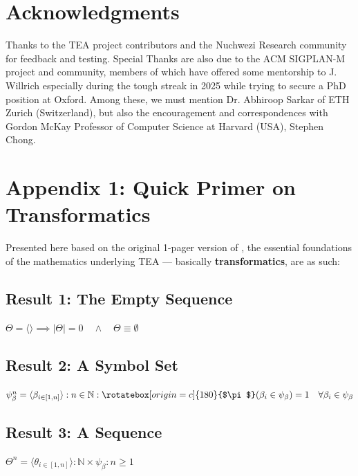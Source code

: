 \documentclass[acmtoplas]{acmart}
\newcommand{\invpi}[1]{\mathop{\rotatebox[origin=c]{180}{$\pi$}}#1}
\begin{document}
\section*{Acknowledgments}
\label{SECACK}

Thanks to the TEA project contributors and the Nuchwezi Research community for feedback and testing. Special Thanks are also due to the ACM SIGPLAN-M project and community, members of which have offered some mentorship to J. Willrich especially during the tough streak in 2025 while trying to secure a PhD position at Oxford. Among these, we must mention Dr. Abhiroop Sarkar of ETH Zurich (Switzerland), but also the encouragement and correspondences with Gordon McKay Professor of Computer Science at Harvard (USA), Stephen Chong.

\section*{Appendix 1: Quick Primer on Transformatics}
\label{SEC11}

\noindent Presented here based on the original 1-pager version \cite{lutalo_2025_trans101_1page} of \cite{Lutalo2025_transformatics_thesis}, the essential foundations of the mathematics underlying TEA --- basically \textbf{transformatics}, are as such:

\subsection{Result 1: The Empty Sequence\cite{lnspaper}}
\label{RES1}

$\Theta = \langle \rangle \implies |\Theta| = 0 \quad \land \quad \Theta \equiv \emptyset$

\subsection{Result 2: A Symbol Set\cite{Lutalo2024gtnc}}

$\psi_\beta^n = \langle \beta_{i \in [1,n]} \rangle : n \in \mathbb{N} : \invpi(\beta_i \in \psi_\beta) = 1 \quad \forall \beta_i \in \psi_\beta$

\subsection{Result 3: A Sequence\cite{lnspaper}}
\label{RES3}

$\Theta^n = \langle \theta_{i \in [1,n]} \rangle : \mathbb{N} \times \psi_\beta : n \geq 1$
\end{document}

